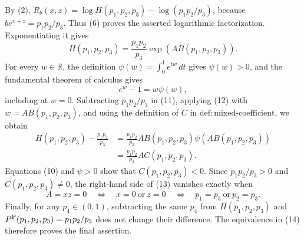 By (2), \(R_b(x,z)=\log H(p_1,p_2,p_3)-\log(p_1p_2/p_3)\), because \(be^{x+z}=p_1p_2/p_3\).  Thus (6) proves the asserted logarithmic factorization.  Exponentiating it gives
\[
H(p_1,p_2,p_3)
=\frac{p_1p_2}{p_3}\exp\!\left(A B(p_1,p_2,p_3)\right).
\tag{11}
\]
For every \(w\in\mathbb R\), the definition \(\psi(w)=\int_0^1e^{tw}\,dt\) gives \(\psi(w)>0\), and the fundamental theorem of calculus gives
\[
e^w-1=w\psi(w),
\tag{12}
\]
including at \(w=0\).  Subtracting \(p_1p_2/p_3\) in (11), applying (12) with \(w=A B(p_1,p_2,p_3)\), and using the definition of \(C\) in \(\mathrm{def{:}mixed\text{-}coefficient}\), we obtain
\[
\begin{aligned}
H(p_1,p_2,p_3)-\frac{p_1p_2}{p_3}
&=\frac{p_1p_2}{p_3}A B(p_1,p_2,p_3)
\psi\!\left(A B(p_1,p_2,p_3)\right)\\
&=\frac{p_1p_2}{p_3}A C(p_1,p_2,p_3).
\end{aligned}
\tag{13}
\]
Equations (10) and \(\psi>0\) show that \(C(p_1,p_2,p_3)<0\).  Since \(p_1p_2/p_3>0\) and \(C(p_1,p_2,p_3)\neq0\), the right-hand side of (13) vanishes exactly when
\[
A=xz=0
\quad\Longleftrightarrow\quad
x=0\ \text{or}\ z=0
\quad\Longleftrightarrow\quad
p_1=p_3\ \text{or}\ p_2=p_3.
\tag{14}
\]
Finally, for any \(p_4\in(0,1)\), subtracting the same \(p_4\) from \(H(p_1,p_2,p_3)\) and \(P^{\rm P}(p_1,p_2,p_3)=p_1p_2/p_3\) does not change their difference.  The equivalence in (14) therefore proves the final assertion.
